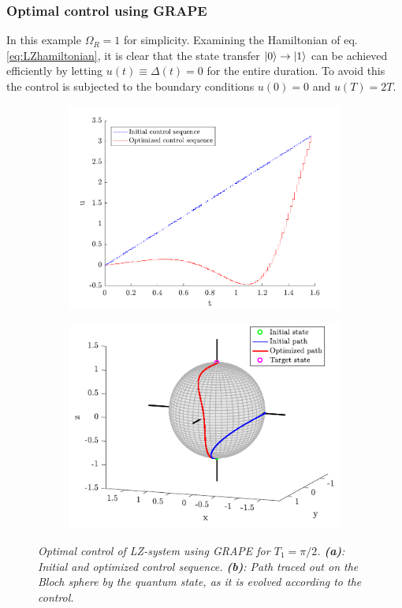 \subsubsection{Optimal control using GRAPE} 
In this example $\Omega_R = 1$ for simplicity. Examining the Hamiltonian of eq. \eqref{eq:LZhamiltonian}, it is clear that the state transfer $\ket{0} \to \ket{1}$ can be achieved efficiently by letting $u(t) \equiv \Delta (t) = 0$ for the entire duration. To avoid this the control is subjected to the boundary conditions $u(0) = 0$ and $u(T) = 2 T$.\\
\begin{figure}[h!]
\centering %
\begin{subfigure}[b]{0.48\textwidth}
	\caption{}  
  	\includegraphics[width=\textwidth]{Figures/LZcontrol1.pdf}
\end{subfigure}
\hspace{3mm}
\begin{subfigure}[b]{0.48\textwidth}
	\caption{}    
  	\includegraphics[width=\textwidth]{Figures/LZpath1.pdf}
\end{subfigure}

\caption{\textit{Optimal control of LZ-system using GRAPE for $T_1 = \pi / 2$. \textbf{(a)}: Initial and optimized control sequence. \textbf{(b)}: Path traced out on the Bloch sphere by the quantum state, as it is evolved according to the control.}}
\label{fig:LZopt1}
\end{figure}
